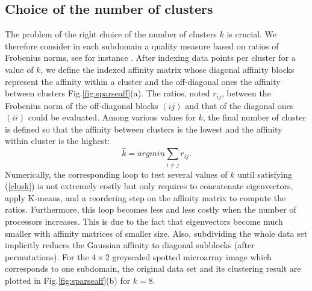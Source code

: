 \documentclass[]{svmult}
\begin{document}
\subsection{Choice of the number of clusters}
\vspace{-0.3cm}

The problem of the right choice of the number of clusters $k$ is crucial.
We therefore consider in each subdomain a
quality measure based on ratios of Frobenius norms, see for instance
\cite{vec08b}. After indexing data points per cluster for a value of $k$, we
define the indexed affinity matrix whose diagonal affinity blocks
represent the affinity within a cluster and the off-diagonal ones the
affinity between clusters Fig.\ref{fig:sparseaff}(a).
The ratios, noted $r_{ij}$, between the Frobenius norm of the off-diagonal
blocks $(ij)$ and that of the diagonal ones $(ii)$ could be evaluated.  %
Among various values for $k$, the final number of cluster is defined so that
the affinity between clusters is the lowest and the affinity within cluster
is the highest:
\begin{equation}
\hat{k} = argmin \sum_{i\neq j} r_{ij}. \label{clusk}
\end{equation} 
Numerically, the corresponding loop to test several values of $k$ until
satisfying (\ref{clusk}) is not extremely costly but only requires to
concatenate eigenvectors, apply K-means, and a reordering step on the affinity
matrix to compute the ratios.  Furthermore, this loop becomes less and less
costly when the number of processors increases. This is due to the fact that
eigenvectors become much smaller with affinity matrices of smaller size. Also,
subdividing the whole data set implicitly reduces the Gaussian affinity to
diagonal subblocks (after permutations).
For the $4 \times 2$ greyscaled spotted microarray image which corresponds
to one subdomain, the original data set and its clustering result are plotted in
Fig.\ref{fig:sparseaff}(b) for $k=8$.
\end{document}

